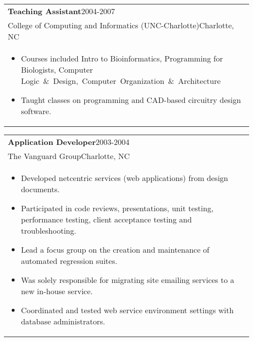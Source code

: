 \documentclass[12pt]{report}
\def\fullLength{6.5in}
\begin{document}
\vspace{-10.0mm}

\begin{table}[!ht]
\begin{tabular}{p{\fullLength}}
\textbf{Teaching Assistant}\hfill 2004-2007\\
College of Computing and Informatics (UNC-Charlotte)\hfill Charlotte, NC\\
\vspace{-7.0mm}
\begin{itemize}\addtolength{\itemsep}{-0.5\baselineskip}
\item Courses included Intro to Bioinformatics, Programming for Biologists,
Computer Logic~\&~Design,~Computer~Organization~\&~Architecture
\item Taught classes on programming and CAD-based circuitry design software.
\end{itemize}
\end{tabular}
\end{table}

\clearpage

\begin{table}[!ht]
\begin{tabular}{p{\fullLength}}
\textbf{Application Developer}\hfill 2003-2004\\
The Vanguard Group\hfill Charlotte, NC\\
\vspace{-7.0mm}
\begin{itemize}\addtolength{\itemsep}{-0.5\baselineskip}
\item Developed netcentric services (web applications) from design documents.
\item Participated in code reviews, presentations, unit testing, performance testing, client acceptance testing and troubleshooting.
\item Lead a focus group on the creation and maintenance of automated regression suites.
\item Was solely responsible for migrating site emailing services to a new in-house service.
\item Coordinated and tested web service environment settings with database administrators.
\end{itemize}
\end{tabular}
\end{table}

\vspace{-10.0mm}
\end{document}

